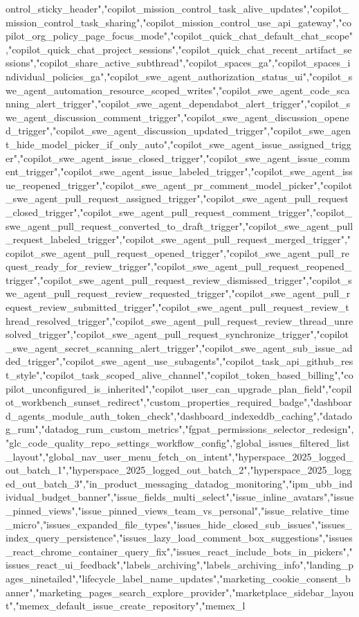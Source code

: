 ontrol_sticky_header","copilot_mission_control_task_alive_updates","copilot_mission_control_task_sharing","copilot_mission_control_use_api_gateway","copilot_org_policy_page_focus_mode","copilot_quick_chat_default_chat_scope","copilot_quick_chat_project_sessions","copilot_quick_chat_recent_artifact_sessions","copilot_share_active_subthread","copilot_spaces_ga","copilot_spaces_individual_policies_ga","copilot_swe_agent_authorization_status_ui","copilot_swe_agent_automation_resource_scoped_writes","copilot_swe_agent_code_scanning_alert_trigger","copilot_swe_agent_dependabot_alert_trigger","copilot_swe_agent_discussion_comment_trigger","copilot_swe_agent_discussion_opened_trigger","copilot_swe_agent_discussion_updated_trigger","copilot_swe_agent_hide_model_picker_if_only_auto","copilot_swe_agent_issue_assigned_trigger","copilot_swe_agent_issue_closed_trigger","copilot_swe_agent_issue_comment_trigger","copilot_swe_agent_issue_labeled_trigger","copilot_swe_agent_issue_reopened_trigger","copilot_swe_agent_pr_comment_model_picker","copilot_swe_agent_pull_request_assigned_trigger","copilot_swe_agent_pull_request_closed_trigger","copilot_swe_agent_pull_request_comment_trigger","copilot_swe_agent_pull_request_converted_to_draft_trigger","copilot_swe_agent_pull_request_labeled_trigger","copilot_swe_agent_pull_request_merged_trigger","copilot_swe_agent_pull_request_opened_trigger","copilot_swe_agent_pull_request_ready_for_review_trigger","copilot_swe_agent_pull_request_reopened_trigger","copilot_swe_agent_pull_request_review_dismissed_trigger","copilot_swe_agent_pull_request_review_requested_trigger","copilot_swe_agent_pull_request_review_submitted_trigger","copilot_swe_agent_pull_request_review_thread_resolved_trigger","copilot_swe_agent_pull_request_review_thread_unresolved_trigger","copilot_swe_agent_pull_request_synchronize_trigger","copilot_swe_agent_secret_scanning_alert_trigger","copilot_swe_agent_sub_issue_added_trigger","copilot_swe_agent_use_subagents","copilot_task_api_github_rest_style","copilot_task_scoped_alive_channel","copilot_token_based_billing","copilot_unconfigured_is_inherited","copilot_user_can_upgrade_plan_field","copilot_workbench_sunset_redirect","custom_properties_required_badge","dashboard_agents_module_auth_token_check","dashboard_indexeddb_caching","datadog_rum","datadog_rum_custom_metrics","fgpat_permissions_selector_redesign","glc_code_quality_repo_settings_workflow_config","global_issues_filtered_list_layout","global_nav_user_menu_fetch_on_intent","hyperspace_2025_logged_out_batch_1","hyperspace_2025_logged_out_batch_2","hyperspace_2025_logged_out_batch_3","in_product_messaging_datadog_monitoring","ipm_ubb_individual_budget_banner","issue_fields_multi_select","issue_inline_avatars","issue_pinned_views","issue_pinned_views_team_vs_personal","issue_relative_time_micro","issues_expanded_file_types","issues_hide_closed_sub_issues","issues_index_query_persistence","issues_lazy_load_comment_box_suggestions","issues_react_chrome_container_query_fix","issues_react_include_bots_in_pickers","issues_react_ui_feedback","labels_archiving","labels_archiving_info","landing_pages_ninetailed","lifecycle_label_name_updates","marketing_cookie_consent_banner","marketing_pages_search_explore_provider","marketplace_sidebar_layout","memex_default_issue_create_repository","memex_l